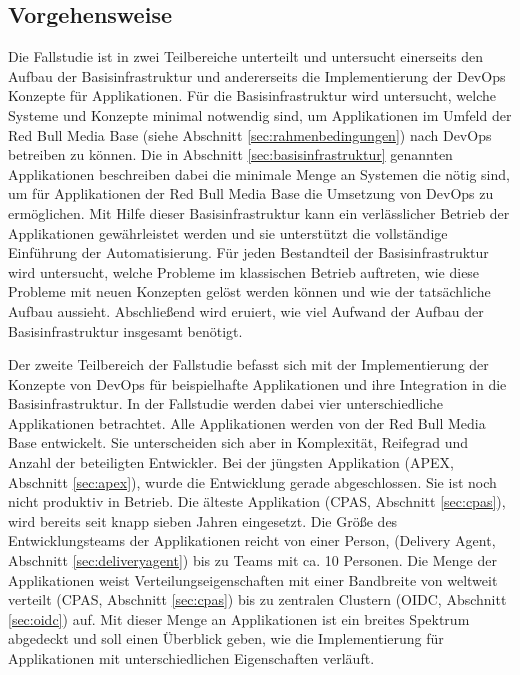 \subsection{Vorgehensweise}
\label{sec:vorgehensweise}
Die Fallstudie ist in zwei Teilbereiche unterteilt und untersucht einerseits den Aufbau der Basisinfrastruktur und andererseits die Implementierung der DevOps Konzepte für Applikationen. Für die Basisinfrastruktur wird untersucht, welche Systeme und Konzepte minimal notwendig sind, um Applikationen im Umfeld der Red Bull Media Base (siehe Abschnitt \ref{sec:rahmenbedingungen}) nach DevOps betreiben zu können. Die in Abschnitt \ref{sec:basisinfrastruktur} genannten Applikationen beschreiben dabei die minimale Menge an Systemen die nötig sind, um für Applikationen der Red Bull Media Base die Umsetzung von DevOps zu ermöglichen. Mit Hilfe dieser Basisinfrastruktur kann ein verlässlicher Betrieb der Applikationen gewährleistet werden und sie unterstützt die vollständige Einführung der Automatisierung. Für jeden Bestandteil der Basisinfrastruktur wird untersucht, welche Probleme im klassischen Betrieb auftreten, wie diese Probleme mit neuen Konzepten gelöst werden können und wie der tatsächliche Aufbau aussieht. Abschließend wird eruiert, wie viel Aufwand der Aufbau der Basisinfrastruktur insgesamt benötigt.
 
Der zweite Teilbereich der Fallstudie befasst sich mit der Implementierung der Konzepte von DevOps für beispielhafte Applikationen und ihre Integration in die Basisinfrastruktur. In der Fallstudie werden dabei vier unterschiedliche Applikationen betrachtet. Alle Applikationen werden von der Red Bull Media Base entwickelt. Sie unterscheiden sich aber in Komplexität, Reifegrad und Anzahl der beteiligten Entwickler. Bei der jüngsten Applikation (APEX, Abschnitt \ref{sec:apex}), wurde die Entwicklung gerade abgeschlossen. Sie ist noch nicht produktiv in Betrieb. Die älteste Applikation (CPAS, Abschnitt \ref{sec:cpas}), wird bereits seit knapp sieben Jahren eingesetzt. Die Größe des Entwicklungsteams der Applikationen reicht von einer Person, (Delivery Agent, Abschnitt \ref{sec:deliveryagent}) bis zu Teams mit ca. 10 Personen. Die Menge der Applikationen weist Verteilungseigenschaften mit einer Bandbreite von weltweit verteilt (CPAS, Abschnitt \ref{sec:cpas}) bis zu zentralen Clustern (OIDC, Abschnitt \ref{sec:oidc}) auf. Mit dieser Menge an Applikationen ist ein breites Spektrum abgedeckt und soll einen Überblick geben, wie die Implementierung für Applikationen mit unterschiedlichen Eigenschaften verläuft.

